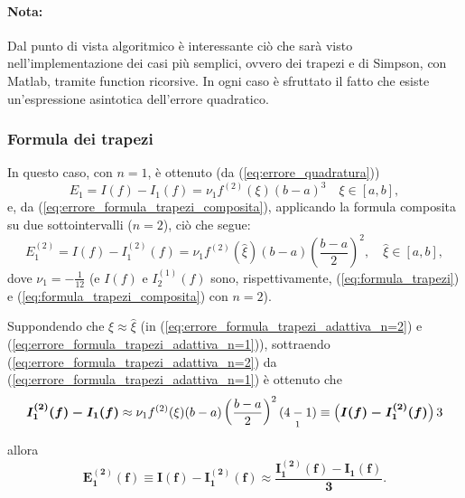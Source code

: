 \paragraph{Nota:} Dal punto di vista algoritmico è interessante ciò che sarà visto nell'implementazione dei casi più semplici, ovvero dei trapezi e di Simpson, con Matlab, tramite function ricorsive. In ogni caso è sfruttato il fatto che esiste un'espressione asintotica dell'errore quadratico.

\subsubsection{Formula dei trapezi}
In questo caso, con $n=1$, è ottenuto (da (\ref{eq:errore_quadratura}))
\begin{equation}\label{eq:errore_formula_trapezi_adattiva_n=1}
    E_1 = I(f)-I_1(f)=\nu_1 f^{(2)}(\xi)(b-a)^3\quad \xi\in[a,b],
\end{equation}
e, da (\ref{eq:errore_formula_trapezi_composita}), applicando la formula composita su due sottointervalli ($n=2$), ciò che segue:
\begin{equation}\label{eq:errore_formula_trapezi_adattiva_n=2}
    E_1^{(2)} = I(f)-I_1^{(2)}(f)=\nu_1 f^{(2)}(\widehat\xi)(b-a)\left(\frac{b-a}{2}\right)^2,\quad\widehat\xi\in [a,b],
\end{equation}
dove $\nu_1=-\frac{1}{12}$ (e $I(f)$ e $I_2^(1)(f)$ sono, rispettivamente, (\ref{eq:formula_trapezi}) e (\ref{eq:formula_trapezi_composita}) con $n=2$).

Suppondendo che $\xi\approx\widehat{\xi}$ (in (\ref{eq:errore_formula_trapezi_adattiva_n=2}) e (\ref{eq:errore_formula_trapezi_adattiva_n=1})), sottraendo (\ref{eq:errore_formula_trapezi_adattiva_n=2}) da (\ref{eq:errore_formula_trapezi_adattiva_n=1}) è ottenuto che
\begin{equation*}
    \boldsymbol{I_1^{(2)}(f)-I_1(f)}\approx\nu_1 f^{(2)}(\xi)(b-a)\left(\frac{b-a}{2}\right)^2\underset{\footnotemark}{(4-1)}\equiv \left(\boldsymbol{I(f)-I_1^{(2)}(f)}\right) 3
\end{equation*}
allora
\begin{equation*}
    \boldsymbol{E_1^{(2)}(f)\equiv I(f)-I_1^{(2)}(f)\approx\frac{I_1^{(2)}(f)-I_1(f)}{3}}.
\end{equation*}


